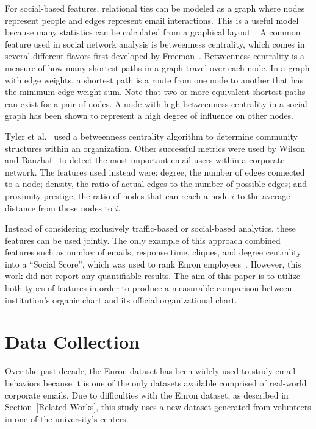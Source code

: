 \documentclass[10pt,twocolumn,conference]{IEEEtran}
\begin{document}
For social-based features, relational ties can be modeled as a graph where nodes represent people and edges represent email interactions.
This is a useful model because many statistics can be calculated from a graphical layout~\cite{wasserman1994social}.
A common feature used in social network analysis is betweenness centrality, which comes in several different flavors first developed by Freeman~\cite{freeman1977set}.
Betweenness centrality is a measure of how many shortest paths in a graph travel over each node.
In a graph with edge weights, a shortest path is a route from one node to another that has the minimum edge weight sum.
Note that two or more equivalent shortest paths can exist for a pair of nodes.
A node with high betweenness centrality in a social graph has been shown to represent a high degree of influence on other nodes.

Tyler et al.~\cite{tyler2005mail} used a betweenness centrality algorithm to determine community structures within an organization.
Other successful metrics were used by Wilson and Banzhaf~\cite{wilson2009discovery} to detect the most important email users within a corporate network.
The features used instead were: degree, the number of edges connected to a node; density, the ratio of actual edges to the number of possible edges; and proximity prestige, the ratio of nodes that can reach a node $i$ to the average distance from those nodes to $i$.

Instead of considering exclusively traffic-based or social-based analytics, these features can be used jointly.
The only example of this approach combined features such as number of emails, response time, cliques, and degree centrality into a ``Social Score'', which was used to rank Enron employees~\cite{rowe2007automated}.  
However, this work did not report any quantifiable results.
The aim of this paper is to utilize both types of features in order to produce a measurable comparison between institution's organic chart and its official organizational chart.

\section{Data Collection} \label{Data Collection}

Over the past decade, the Enron dataset has been widely used to study email behaviors because it is one of the only datasets available comprised of real-world corporate emails.
Due to difficulties with the Enron dataset, as described in Section~\ref{Related Works}, this study uses a new dataset generated from volunteers in one of the university's centers.
\end{document}
